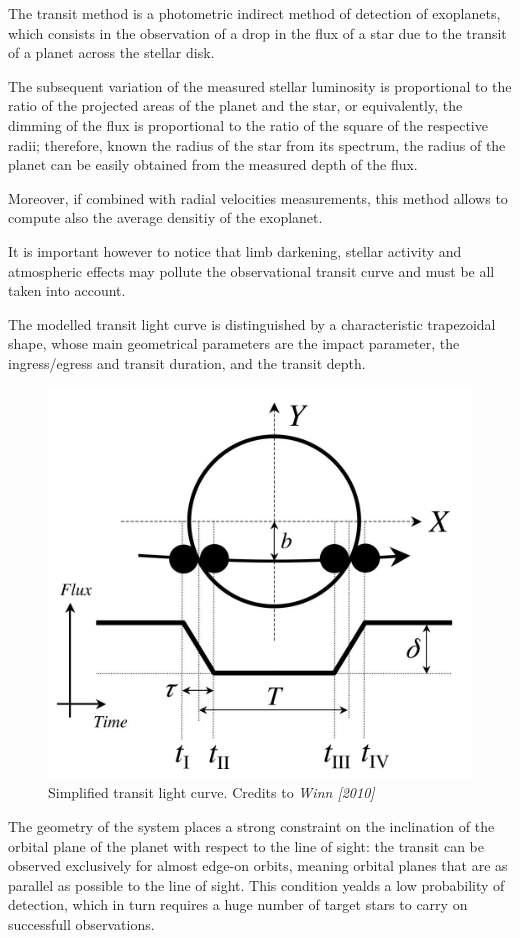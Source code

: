 \documentclass[a4paper,11pt,twocolumn]{article}
\begin{document}
The transit method is a photometric indirect method of detection of exoplanets, which consists in the observation of a drop in the flux of a star due to the transit of a planet across the stellar disk. 

The subsequent variation of the measured stellar luminosity is proportional to the ratio of the projected areas of the planet and the star, or equivalently, the dimming of the flux is proportional to the ratio of the square of the respective radii; therefore, known the radius of the star from its spectrum, the radius of the planet can be easily obtained from the measured depth of the flux.

Moreover, if combined with radial velocities measurements, this method allows to compute also the average densitiy of the exoplanet.

It is important however to notice that limb darkening, stellar activity and atmospheric effects may pollute the observational transit curve and must be all taken into account.

The modelled transit light curve is distinguished by a characteristic trapezoidal shape, whose main geometrical parameters are the impact parameter, the ingress/egress and transit duration, and the transit depth.
\begin{figure}[H]
    \centering  
    \includegraphics[scale=0.18, angle=0]{../pictures/transit.jpeg}
    \caption{Simplified transit light curve. Credits to \textit{Winn [2010]}}
\end{figure}
The geometry of the system places a strong constraint on the inclination of the orbital plane of the planet with respect to the line of sight: the transit can be observed exclusively for almost edge-on orbits, meaning orbital planes that are as parallel as possible to the line of sight. This condition yealds a low probability of detection, which in turn requires a huge number of target stars to carry on successfull observations.
\end{document}
